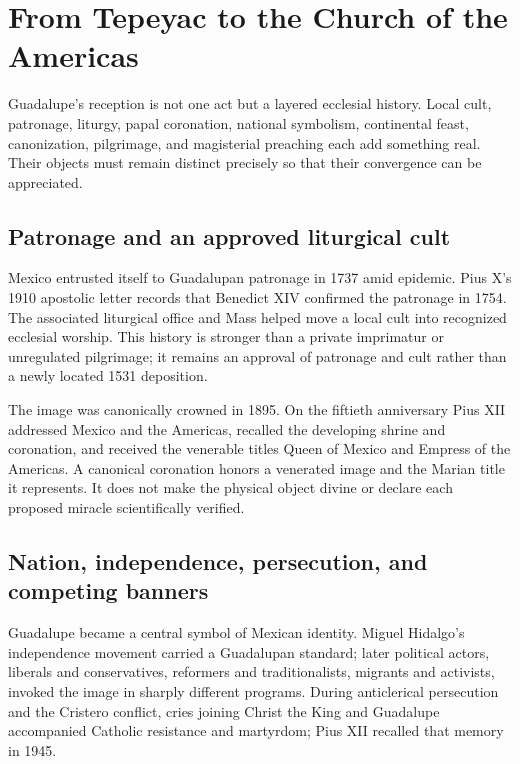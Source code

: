 \section{From Tepeyac to the Church of the Americas}

Guadalupe's reception is not one act but a layered ecclesial history. Local cult, patronage, liturgy, papal coronation, national symbolism, continental feast, canonization, pilgrimage, and magisterial preaching each add something real. Their objects must remain distinct precisely so that their convergence can be appreciated.

\subsection{Patronage and an approved liturgical cult}

Mexico entrusted itself to Guadalupan patronage in 1737 amid epidemic. Pius X's 1910 apostolic letter records that Benedict XIV confirmed the patronage in 1754. The associated liturgical office and Mass helped move a local cult into recognized ecclesial worship. This history is stronger than a private imprimatur or unregulated pilgrimage; it remains an approval of patronage and cult rather than a newly located 1531 deposition.

The image was canonically crowned in 1895. On the fiftieth anniversary Pius XII addressed Mexico and the Americas, recalled the developing shrine and coronation, and received the venerable titles Queen of Mexico and Empress of the Americas. A canonical coronation honors a venerated image and the Marian title it represents. It does not make the physical object divine or declare each proposed miracle scientifically verified.

\subsection{Nation, independence, persecution, and competing banners}

Guadalupe became a central symbol of Mexican identity. Miguel Hidalgo's independence movement carried a Guadalupan standard; later political actors, liberals and conservatives, reformers and traditionalists, migrants and activists, invoked the image in sharply different programs. During anticlerical persecution and the Cristero conflict, cries joining Christ the King and Guadalupe accompanied Catholic resistance and martyrdom; Pius XII recalled that memory in 1945.

